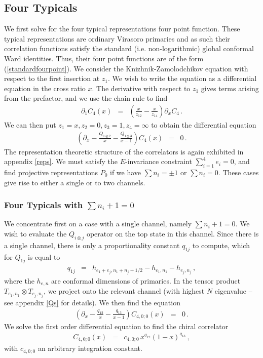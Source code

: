\documentclass[12pt]{article}
\numberwithin{equation}{section}
\numberwithin{equation}{section}
\numberwithin{table}{section}\setlength{\multlinegap}{25pt}
\begin{document}
\subsection{Four Typicals} 
We first solve for the four typical representations
four point function.  These typical representations are ordinary Virasoro primaries
and as such their correlation functions satisfy the standard (i.e. non-logarithmic)
global conformal Ward identities. Thus, their four point functions are of the form
(\ref{standardfourpoint}).
We consider the Knizhnik-Zamolodchikov equation with respect to the first
insertion at $z_1$. We wish to write the equation as a differential equation in the cross ratio $x$.
The derivative with respect to $z_1$ gives terms arising from
the prefactor, and we  use the chain rule to find
\begin{eqnarray}
\partial_1 C_4(x) &=& (\frac{x}{z_{12}}-\frac{x}{z_{14}}) \partial_x C_4 \, .
\end{eqnarray}
We can then put $z_1=x,z_2=0,z_3=1,z_4=\infty$ to obtain the differential equation
\begin{eqnarray}
( \partial_x  
- \frac{Q_{1 \otimes 2}}{x} - \frac{Q_{1 \otimes 3}}{x-1}) C_4(x) &=& 0
\, .
\end{eqnarray}
The representation theoretic structure of the correlators is again exhibited in appendix \ref{reps}.
We must satisfy the $E$-invariance constraint
 $\sum_{i=1}^4 e_i=0$, and find 
projective representations $P_0$
if we have $\sum n_i = \pm 1$ or $\sum n_i=0$.
These cases give rise to either a single or to two channels.
\subsubsection{Four Typicals  with $\sum n_i+1=0$} 
We concentrate first on a case with 
a single channel, namely $\sum n_i +1=0$.
We wish to evaluate the $Q_{i \otimes j}$ operator on the top state in this channel.
Since there is a single channel, there is only a proportionality constant $q_{1j}$ to compute, which for $Q_{1j}$ is  equal to
\begin{eqnarray}
q_{1j} &=& h_{e_{1}+e_j,n_{1}+n_j+1/2} - h_{e_1,n_1} - h_{e_j,n_j} \, ,
\end{eqnarray}
where the $h_{e,n}$ are conformal dimensions of primaries.
In the tensor product $T_{e_1,n_1} \otimes T_{e_j,n_j}$, we project onto the relevant channel (with highest $N$ eigenvalue --
see appendix \ref{Qs} for details).
We then find the equation \begin{eqnarray}
( \partial_x - \frac{q_{12}}{x} 
-\frac{q_{13}}{x-1}  
) C_{4,0;0}(x) &=& 0
\, .
\end{eqnarray}
We solve the first order differential equation to find the chiral correlator
\begin{eqnarray}
C_{4,0;0} (x) &=& c_{4,0;0} \,  x^{q_{12}} (1-x)^{q_{13}} \, ,
\end{eqnarray}
with $c_{4,0;0}$ an arbitrary integration constant.
\end{document}
